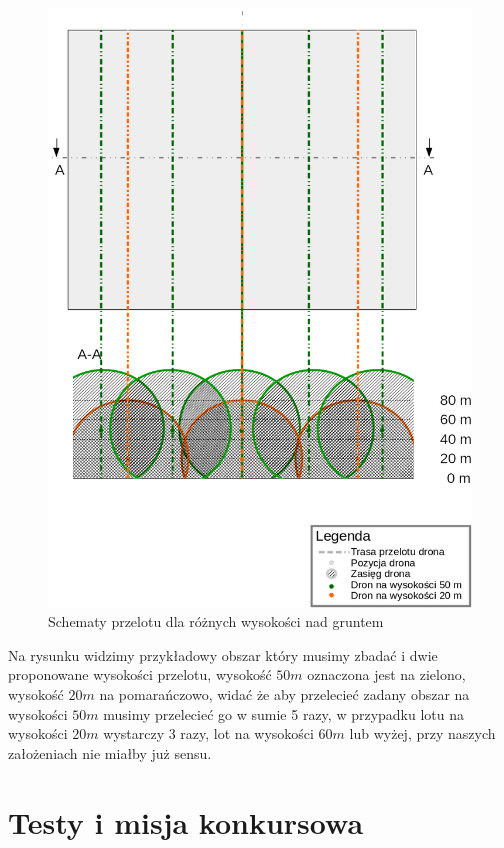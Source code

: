 \begin{figure}[!th]
    \centering
    \includegraphics[width=15cm]{zalaczniki/obrazy/schemat_przelotu.png}
    \caption{Schematy przelotu dla różnych wysokości nad gruntem}
    \label{fig:schematprzelotu}
\end{figure}

Na rysunku widzimy przykładowy obszar który musimy zbadać i dwie proponowane wysokości przelotu, wysokość $50 m$ oznaczona jest na zielono, wysokość $20 m$ na pomarańczowo, widać że aby przelecieć zadany obszar na wysokości $50 m$ musimy przelecieć go w sumie 5 razy, w przypadku lotu na wysokości $20 m$ wystarczy 3 razy, lot na wysokości $60 m$ lub wyżej, przy naszych założeniach nie miałby już sensu.

\section{Testy i misja konkursowa}

